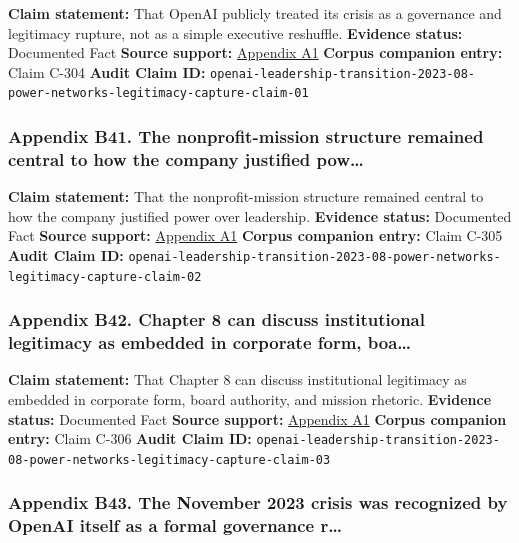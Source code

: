 \documentclass[
  american,
  11pt,
  letterpaper,
]{article}
\begin{document}
\textbf{Claim statement:} That OpenAI publicly treated its crisis as a
governance and legitimacy rupture, not as a simple executive reshuffle.
\textbf{Evidence status:} Documented Fact \textbf{Source support:}
\hyperref[ch-08-appendix-a1-openai-announces-leadership-transition]{Appendix
A1} \textbf{Corpus companion entry:} Claim C-304 \textbf{Audit Claim
ID:}
\texttt{openai-leadership-transition-2023-08-power-networks-legitimacy-capture-claim-01}

\subsubsection{Appendix B41. The nonprofit-mission structure remained
central to how the company justified
pow\ldots{}}\label{ch-08-appendix-b41-the-nonprofit-mission-structure-remained-central-to-how-the-company-justified-pow}

\textbf{Claim statement:} That the nonprofit-mission structure remained
central to how the company justified power over leadership.
\textbf{Evidence status:} Documented Fact \textbf{Source support:}
\hyperref[ch-08-appendix-a1-openai-announces-leadership-transition]{Appendix
A1} \textbf{Corpus companion entry:} Claim C-305 \textbf{Audit Claim
ID:}
\texttt{openai-leadership-transition-2023-08-power-networks-legitimacy-capture-claim-02}

\subsubsection{Appendix B42. Chapter 8 can discuss institutional
legitimacy as embedded in corporate form,
boa\ldots{}}\label{ch-08-appendix-b42-chapter-8-can-discuss-institutional-legitimacy-as-embedded-in-corporate-form-boa}

\textbf{Claim statement:} That Chapter 8 can discuss institutional
legitimacy as embedded in corporate form, board authority, and mission
rhetoric. \textbf{Evidence status:} Documented Fact \textbf{Source
support:}
\hyperref[ch-08-appendix-a1-openai-announces-leadership-transition]{Appendix
A1} \textbf{Corpus companion entry:} Claim C-306 \textbf{Audit Claim
ID:}
\texttt{openai-leadership-transition-2023-08-power-networks-legitimacy-capture-claim-03}

\subsubsection{Appendix B43. The November 2023 crisis was recognized by
OpenAI itself as a formal governance
r\ldots{}}\label{ch-08-appendix-b43-the-november-2023-crisis-was-recognized-by-openai-itself-as-a-formal-governance-r}
\end{document}

